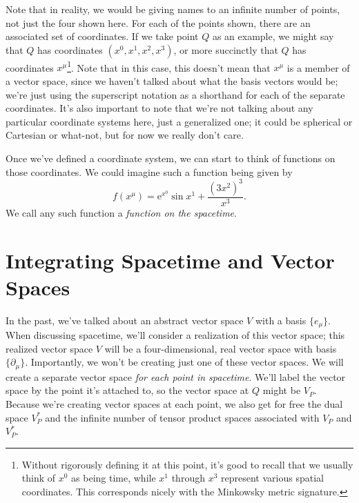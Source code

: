 Note that in reality, we would be giving names to an infinite number of points, not just the four shown here.
For each of the points shown, there are an associated set of coordinates.
If we take point $Q$ as an example, we might say that $Q$ has coordinates $(x^0,x^1,x^2,x^3)$, or more succinctly that $Q$ has coordinates $x^\mu$\footnote{Without rigorously defining it at this point, it's good to recall that we usually think of $x^0$ as being time, while $x^1$ through $x^3$ represent various spatial coordinates. This corresponds nicely with the Minkowsky metric signature.}.
Note that in this case, this doesn't mean that $x^\mu$ is a member of a vector space, since we haven't talked about what the basis vectors would be; we're just using the superscript notation as a shorthand for each of the separate coordinates.
It's also important to note that we're not talking about any particular coordinate systems here, just a generalized one; it could be spherical or Cartesian or what-not, but for now we really don't care.

Once we've defined a coordinate system, we can start to think of functions on those coordinates.
We could imagine such a function being given by
\[ f(x^\mu) = \mathrm{e}^{x^0}\sin x^1 + \frac{(3x^2)^3}{x^3}. \]
We call any such function a \emph{function on the spacetime}.

\section{Integrating Spacetime and Vector Spaces}
In the past, we've talked about an abstract vector space $V$ with a basis $\{e_\mu\}$.
When discussing spacetime, we'll consider a realization of this vector space;
this realized vector space $V$ will be a four-dimensional, real vector space with basis $\{\partial_\mu\}$.
Importantly, we won't be creating just one of these vector spaces.
We will create a separate vector space \emph{for each point in spacetime}.
We'll label the vector space by the point it's attached to, so the vector space at $Q$ might be $V_P$.
Because we're creating vector spaces at each point, we also get for free the dual space $V_P^*$ and the infinite number of tensor product spaces associated with $V_P$ and $V^*_P$.
